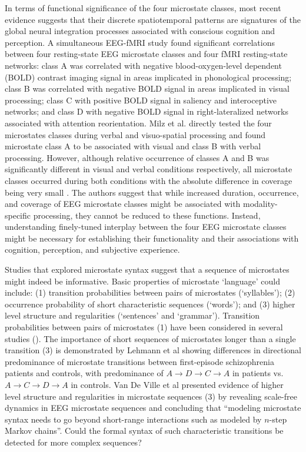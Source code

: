 \documentclass[journal]{IEEEtran}
\begin{document}
In terms of functional significance of the four microstate classes, most recent evidence suggests that their discrete spatiotemporal patterns are signatures of the global neural integration processes associated with conscious cognition and perception.  A simultaneous EEG-fMRI study \cite{Britz2010} found significant correlations between four resting-state EEG microstate classes and four fMRI resting-state networks: class A was correlated with negative blood-oxygen-level dependent (BOLD) contrast imaging signal in areas implicated in phonological processing; class B was correlated with negative BOLD signal in areas implicated in visual processing; class C with positive BOLD signal in saliency and interoceptive networks; and class D with negative BOLD signal in  right-lateralized networks associated with attention reorientation. 
Milz et al. \cite{Milz2016} directly tested the four microstates classes during verbal and visuo-spatial processing and found microstate class A to be associated with visual and class B with verbal processing.  
However, although relative occurrence of classes A and B was significantly different in visual and verbal conditions respectively, all microstate classes occurred during both conditions with the absolute difference in coverage being very small \cite{Milz2016}.  The authors suggest that while increased duration, occurrence, and coverage of EEG microstate classes might be associated with modality-specific processing, they cannot be reduced to these functions. Instead, understanding finely-tuned interplay between the four EEG microstate classes might be necessary for establishing their functionality and their associations with cognition, perception, and subjective experience.  

Studies that explored microstate syntax suggest that a sequence of microstates might indeed be informative.  Basic properties of microstate `language' could include: (1) transition probabilities between pairs of microstates (`syllables'); (2) occurrence probability of short characteristic sequences (`words'); and (3) higher level structure and regularities (`sentences' and `grammar').  Transition probabilities between pairs of microstates (1) have been considered in several studies 
(\cite{Brodbeck2012,Wackermann1993,Lehmann2005,Schlegel2012}).
The importance of short sequences of microstates longer than a single transition (3) is demonstrated by  Lehmann et al \cite{Lehmann2005} showing differences in directional predominance of  microstate transitions between first-episode schizophrenia patients and controls, with predominance of $A \rightarrow D \rightarrow C \rightarrow A$ in patients vs.\ $A  \rightarrow C \rightarrow D \rightarrow A$ in controls.
   Van De Ville et al \cite{VanDeVille2010} presented evidence of higher level structure and regularities in microstate sequences (3) by revealing scale-free dynamics in EEG microstate sequences and concluding that ``modeling microstate syntax needs to go beyond short-range interactions such as modeled by $n$-step Markov chains''. 
Could the formal syntax of such characteristic transitions be detected for more complex sequences?  
\end{document}
